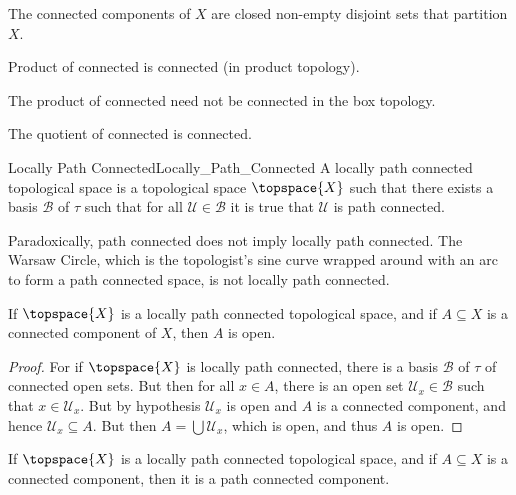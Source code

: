 \documentclass{article}                                                        %
\begin{document}
        \begin{theorem}
            The connected components of $X$ are closed non-empty disjoint sets
            that partition $X$.
        \end{theorem}
        \begin{theorem}
            Product of connected is connected (in product topology).
        \end{theorem}
        The product of connected need not be connected in the box topology.
        \begin{theorem}
            The quotient of connected is connected.
        \end{theorem}
        \begin{fdefinition}{Locally Path Connected}{Locally_Path_Connected}
            A locally path connected topological space is a topological space
            $\topspace{X}$ such that there exists a basis $\mathcal{B}$ of
            $\tau$ such that for all $\mathcal{U}\in\mathcal{B}$ it is true that
            $\mathcal{U}$ is path connected.
        \end{fdefinition}
        \begin{example}
            Paradoxically, path connected does not imply locally path connected.
            The Warsaw Circle, which is the topologist's sine curve wrapped
            around with an arc to form a path connected space, is not locally
            path connected.
        \end{example}
        \begin{theorem}
            If $\topspace{X}$ is a locally path connected topological space, and
            if $A\subseteq{X}$ is a connected component of $X$, then $A$ is
            open.
        \end{theorem}
        \begin{proof}
            For if $\topspace{X}$ is locally path connected, there is a basis
            $\mathcal{B}$ of $\tau$ of connected open sets. But then for all
            $x\in{A}$, there is an open set $\mathcal{U}_{x}\in\mathcal{B}$
            such that $x\in\mathcal{U}_{x}$. But by hypothesis
            $\mathcal{U}_{x}$ is open and $A$ is a connected component, and
            hence $\mathcal{U}_{x}\subseteq{A}$. But then
            $A=\bigcup\mathcal{U}_{x}$, which is open, and thus $A$ is open.
        \end{proof}
        \begin{theorem}
            If $\topspace{X}$ is a locally path connected topological space, and
            if $A\subseteq{X}$ is a connected component, then it is a path
            connected component.
        \end{theorem}
\end{document}
